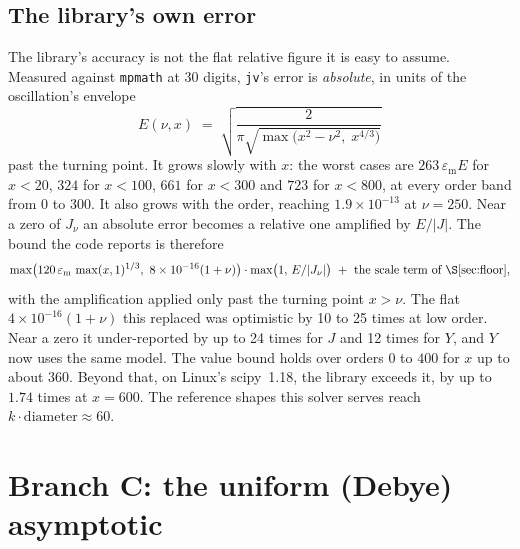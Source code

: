 \documentclass[11pt]{article}
\theoremstyle{remark}
\newcommand{\code}[1]{\texttt{#1}}
\newcommand{\eps}{\varepsilon_{\mathrm{m}}}
\begin{document}
\subsection{The library's own error}
\label{sec:scipybound}

The library's accuracy is not the flat relative figure it is easy to assume. Measured against
\code{mpmath} at 30 digits, \code{jv}'s error is \emph{absolute}, in units of the oscillation's
envelope
\[
  E(\nu,x) \;=\; \sqrt{\frac{2}{\pi\sqrt{\max\big(x^2-\nu^2,\;x^{4/3}\big)}}}
\]
past the turning point. It grows slowly with $x$: the worst cases are $263\,\eps E$ for $x<20$,
$324$ for $x<100$, $661$ for $x<300$ and $723$ for $x<800$, at every order band from $0$ to
$300$. It also grows with the order, reaching $1.9\times10^{-13}$ at $\nu=250$. Near a zero of
$J_\nu$ an absolute error becomes a relative one amplified by $E/|J|$. The bound the code
reports is therefore
\[
  \max\!\big(120\,\eps\,\max(x,1)^{1/3},\ 8\times10^{-16}(1+\nu)\big)\cdot
  \max\!\big(1,\,E/|J_\nu|\big)\ +\ \text{the scale term of \S\ref{sec:floor}},
\]
with the amplification applied only past the turning point $x>\nu$. The flat
$4\times10^{-16}(1+\nu)$ this replaced was optimistic by 10 to 25 times at low order. Near a
zero it under-reported by up to 24 times for $J$ and 12 times for $Y$, and $Y$ now uses the
same model. The value bound holds over orders $0$ to $400$ for $x$ up to about $360$. Beyond
that, on Linux's scipy~1.18, the library exceeds it, by up to $1.74$ times at $x=600$. The reference shapes this solver serves reach
$k\cdot\mathrm{diameter}\approx60$.

\section{Branch C: the uniform (Debye) asymptotic}
\end{document}

